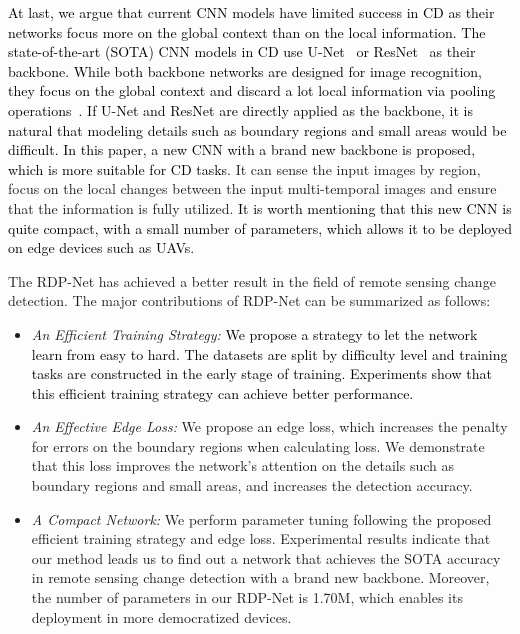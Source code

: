 \documentclass[lettersize,journal]{IEEEtran}
\newcommand{\edita}[1]{\textcolor{black}{#1}}
\begin{document}
\edita{At last, we argue that current CNN models have limited success in CD as their networks focus more on the global context than on the local information.
The state-of-the-art (SOTA) CNN models in CD use U-Net~\cite{ronneberger2015u} or ResNet~\cite{he2016deep} as their backbone.
While both backbone networks are designed for image recognition, they focus on the global context and discard a lot local information via pooling operations~\cite{dwivedi2020benchmarking}. If U-Net and ResNet are directly applied as the backbone, it is natural that modeling details such as boundary regions and small areas would be difficult.
In this paper, a new CNN with a brand new backbone is proposed, which is more suitable for CD tasks.}
It can sense the input images by region, focus on the local changes between the input multi-temporal images and ensure that the information is fully utilized.
\edita{It is worth mentioning that this new CNN is quite compact, with a small number of parameters, which allows it to be deployed on edge devices such as UAVs.}



The RDP-Net has achieved a better result in the field of remote sensing change detection.
The major contributions of RDP-Net can be summarized as follows:
\begin{itemize}
    \item {\it An Efficient Training Strategy:} \edita{We propose a strategy to let the network learn from easy to hard. The datasets are split by difficulty level and training tasks are constructed in the early stage of training. Experiments show that this efficient training strategy can achieve better performance.}
    \item {\it An Effective Edge Loss:} We propose an edge loss, which increases the penalty for errors on the boundary regions when calculating loss. We demonstrate that this loss improves the network's attention on the details such as boundary regions and small areas, and increases the detection accuracy.
    \item {\it A Compact Network:} We perform parameter tuning following the proposed efficient training strategy and edge loss. Experimental results indicate that our method leads us to find out a network that achieves the SOTA accuracy in remote sensing change detection with a brand new backbone. Moreover, the number of parameters in our RDP-Net is 1.70M, which enables its deployment in more democratized devices. 
\end{itemize}
\end{document}
